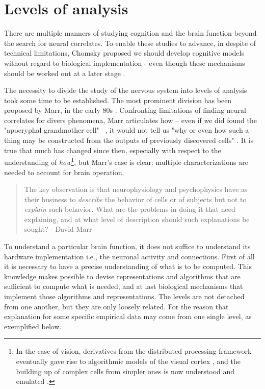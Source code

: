 \section{Levels of analysis}
    There are multiple manners of studying cognition and the brain function beyond the search for neural correlates. To enable these studies to advance, in despite of technical limitations, Chomsky proposed we should develop cognitive models without regard to biological implementation - even though these mechanisms should be worked out at a later stage \cite[p.~12]{chomsky2006language}.

    The necessity to divide the study of the nervous system into levels of analysis took some time to be established. The most prominent division has been proposed by Marr, in the early 80s \cite{leopoldo2018computational}. Confronting limitations of finding neural correlates for divers phenomena, Marr articulates how -- even if we did found the "apocryphal grandmother cell" --, it would not tell us "why or even how such a thing may be constructed from the outputs of previously discovered cells" \cite[p~15]{marr1982vision}. It is true that much has changed since then, especially with respect to the understanding of \textit{how}\footnote{In the case of vision, derivatives from the distributed processing framework eventually gave rise to algorithmic models of the visual cortex \cite{fukushima1980neocognitron}, and the building up of complex cells from simpler ones is now understood and emulated \cite[p~9]{goodfellow2016deep}.}, but Marr's case is clear: multiple characterizations are needed to account for brain operation. 

    \begin{quote}
        The key observation is that neurophysiology and psychophysics have as their business to \textit{describe} the behavior of cells or of subjects but not to \textit{explain} such behavior. What are the problems in doing it that need explaining, and at what level of description should such explanations be sought? - David Marr \cite{marr1982vision}
    \end{quote}

    To understand a particular brain function, it does not suffice to understand its hardware implementation i.e., the neuronal activity and connections. First of all it is necessary to have a precise understanding of what is to be computed. This knowledge makes possible to devise representations and algorithms that are sufficient to compute what is needed, and at last biological mechanisms that implement those algorithms and representations. The levels are not detached from one another, but they are only loosely related. For the reason that explanation for some specific empirical data may come from one single level, as exemplified below.
    
